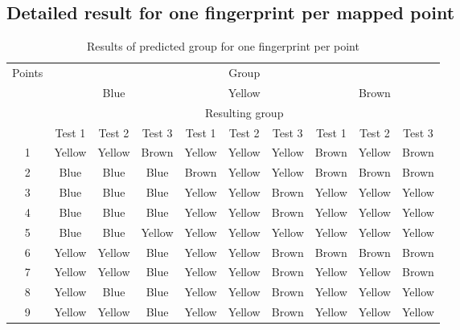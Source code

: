\begin{landscape}
	\chapter{Detailed result for one fingerprint per mapped point}\label{appendix:resultingPointsTable1p}


\begin{table}
\centering
\caption{Results of predicted group for one fingerprint per point} \label{tab:1pResults}
\begin{tabular}{c|ccc|ccc|ccc|}
\multirow{4}{*}{Points} & \multicolumn{9}{c|}{Group}                                                            \\ 
\cline{2-10}
                        & \multicolumn{3}{c|}{Blue} & \multicolumn{3}{c|}{Yellow} & \multicolumn{3}{c|}{Brown}  \\ 
\cline{2-10}
                        & \multicolumn{9}{c|}{Resulting group}                                                  \\ 
\cline{2-10}
                        & Test 1 & Test 2 & Test 3  & Test 1 & Test 2 & Test 3    & Test 1 & Test 2 & Test 3    \\ 
\hline
1                       & Yellow & Yellow & Brown   & Yellow & Yellow & Yellow    & Brown  & Yellow & Brown     \\
2                       & Blue   & Blue   & Blue    & Brown  & Yellow & Yellow    & Brown  & Brown  & Brown     \\
3                       & Blue   & Blue   & Blue    & Yellow & Yellow & Brown     & Yellow & Yellow & Yellow    \\
4                       & Blue   & Blue   & Blue    & Yellow & Yellow & Brown     & Yellow & Yellow & Yellow    \\
5                       & Blue   & Blue   & Yellow  & Yellow & Yellow & Yellow    & Yellow & Yellow & Yellow    \\
6                       & Yellow & Yellow & Blue    & Yellow & Yellow & Brown     & Brown  & Brown  & Brown     \\
7                       & Yellow & Yellow & Blue    & Yellow & Yellow & Brown     & Yellow & Yellow & Brown     \\
8                       & Yellow & Blue   & Blue    & Yellow & Yellow & Brown     & Yellow & Yellow & Yellow    \\
9                       & Yellow & Yellow & Blue    & Yellow & Yellow & Brown     & Yellow & Yellow & Yellow   
\end{tabular}
\end{table}

\end{landscape}
